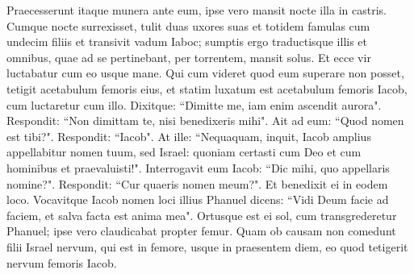\begin{biblechapter}
\verse Praecesserunt itaque munera ante eum, ipse vero mansit nocte illa in castris. 
\verse Cumque nocte surrexisset, tulit duas uxores suas et totidem famulas cum undecim filiis et transivit vadum Iaboc; 
\verse sumptis ergo traductisque illis et omnibus, quae ad se pertinebant, per torrentem, 
\verse mansit solus. Et ecce vir luctabatur cum eo usque mane. 
\verse Qui cum videret quod eum superare non posset, tetigit acetabulum femoris eius, et statim luxatum est acetabulum femoris Iacob, cum luctaretur cum illo. 
\verse Dixitque: “Dimitte me, iam enim ascendit aurora". Respondit: “Non dimittam te, nisi benedixeris mihi". 
\verse Ait ad eum: “Quod nomen est tibi?". Respondit: “Iacob". 
\verse At ille: “Nequaquam, inquit, Iacob amplius appellabitur nomen tuum, sed Israel: quoniam certasti cum Deo et cum hominibus et praevaluisti!". 
\verse Interrogavit eum Iacob: “Dic mihi, quo appellaris nomine?". Respondit: “Cur quaeris nomen meum?". Et benedixit ei in eodem loco. 
\verse Vocavitque Iacob nomen loci illius Phanuel dicens: “Vidi Deum facie ad faciem, et salva facta est anima mea". 
\verse Ortusque est ei sol, cum transgrederetur Phanuel; ipse vero claudicabat propter femur. 
\verse Quam ob causam non comedunt filii Israel nervum, qui est in femore, usque in praesentem diem, eo quod tetigerit nervum femoris Iacob. 
\end{biblechapter}

